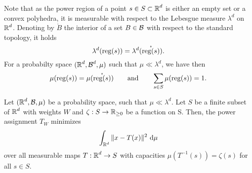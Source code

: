 \documentclass[
     12pt,         %
     a4paper,      %
     BCOR=10mm,     %
     DIV=14,        %
     ]{scrreprt}
\begin{document}
%
%
%
    \begin{rem*} \label{rem::measurabilty}
        Note that as the power region of a point $s\in S\subset \operatorname{\mathbb{R}}^d$ is either an empty set or a convex polyhedra, it is measurable with respect to the Lebesgue measure $\lambda^d$ on $\operatorname{\mathbb{R}}^d$.
        Denoting by $\mathring B$ the interior of a set $B \in \operatorname{\mathcal{B}}$ with respect to the standard topology, it holds 
        \[\lambda^d(\operatorname{reg}(s)) = \lambda^d(\mathring{\operatorname{reg}(s)}).\]
        For a probabilty space $(\operatorname{\mathbb{R}}^d,\operatorname{\mathcal{B}}^d,\mu)$ such that $\mu \ll \lambda^d$, we have then
        \[\mu(\operatorname{reg}(s)) = \mu(\mathring{\operatorname{reg}(s)}) \quad \quad \text{and} \quad \quad \sum_{s\in S} \mu(\operatorname{reg}(s))=1.\]

        
    \end{rem*}
    \begin{lem} \label{lemma::1step}
        Let $(\operatorname{\mathbb{R}}^d,\operatorname{\mathcal{B}},\mu)$ be a probability space, such that $\mu \ll \lambda^d$.  Let $S$ be a finite subset of $\operatorname{\mathbb{R}}^d$ with weights $W$ and $\zeta: S \to \operatorname{\mathbb{R}}_{\ge 0}$ be a function on S.
        Then, the power assignment $T_W $ minimizes 
        \[\int_{\operatorname{\mathbb{R}}^d} \|x-T(x) \|^2 \ {\operatorname{{\mathrm{d}}}} \mu \]
        over all measurable maps $T : \operatorname{\mathbb{R}}^d \to S $ with capacities $\mu(T^{-1} (s)) = \zeta(s)  $ for all $s\in S$.
    \end{lem}
\end{document}
